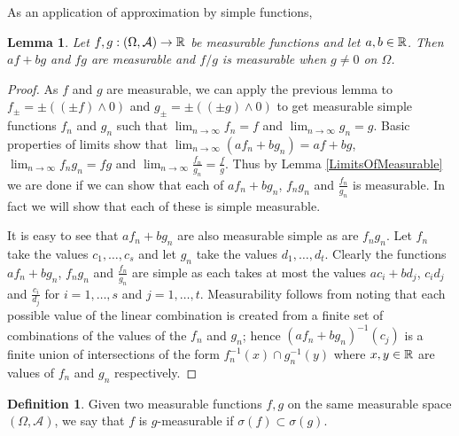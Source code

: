 \documentclass{amsart}
\newtheorem{lem}[thm]{Lemma}
\theoremstyle{remark}
\theoremstyle{definition}
\newtheorem{defn}[thm]{Definition}
\begin{document}
As an application of approximation by simple functions, 
\begin{lem}\label{ArithmeticCombinationsOfMeasurableFunctions}
Let $f,g : (\Omega, \mathcal{A}) \to \mathbb{R}$ be measurable functions
and let $a,b \in \mathbb{R}$.  Then $af + bg$ and $fg$ are measurable and
$f/g$ is measurable when $g \neq 0$ on $\Omega$.
\end{lem}
\begin{proof}As $f$ and $g$ are measurable, we can apply the previous
  lemma to $f_\pm = \pm((\pm f) \wedge 0)$ and $g_{\pm} = \pm((\pm g) \wedge 0)$
  to get measurable simple functions $f_n$ and $g_n$ such that $\lim_{n \to
    \infty} f_n = f$ and $\lim_{n \to
    \infty} g_n = g$.  Basic properties of limits show that $\lim_{n
    \to \infty} (a f_n + b g_n) = a f + b g$, $\lim_{n \to \infty} f_n
  g_n = f g$ and $\lim_{n \to \infty} \frac{f_n}{  g_n} =
  \frac{f}{g}$.  Thus by Lemma \ref{LimitsOfMeasurable} we are done if
  we can show that each of $a f_n + b g_n$, $f_n g_n$ and
  $\frac{f_n}{g_n}$ is measurable.  In fact we will show that each of
  these is simple measurable.

It is easy to see that $a f_n + b g_n$ are also
  measurable simple as are $f_n g_n$.  Let $f_n$ take the values $c_1,
  \dots, c_s$ and let $g_n$ take the values $d_1, \dots, d_t$.  
Clearly the functions  $a f_n + b g_n$, $f_n g_n$ and
  $\frac{f_n}{g_n}$ are simple as each takes at most the values  $a c_i + b d_j$, $c_i d_j$ and
  $\frac{c_i}{d_j}$ for $i=1,\dots,s$ and $j=1,\dots, t$.  
Measurability follows from noting that each
  possible value of the linear combination is created from a finite
  set of combinations of the values of the $f_n$ and $g_n$; hence
  $(af_n + bg_n)^{-1}(c_j)$ is a finite union of intersections of the
  form $f_n^{-1}(x) \cap g_n^{-1}(y)$ where $x,y \in \mathbb{R}$ are
  values of $f_n$ and $g_n$ respectively.
\end{proof}

\begin{defn}Given two measurable functions $f,g$ on the same measurable space
  $(\Omega, \mathcal{A})$, we say that $f$ is $g$-measurable if
  $\sigma(f) \subset \sigma(g)$.
\end{defn}
\end{document}
